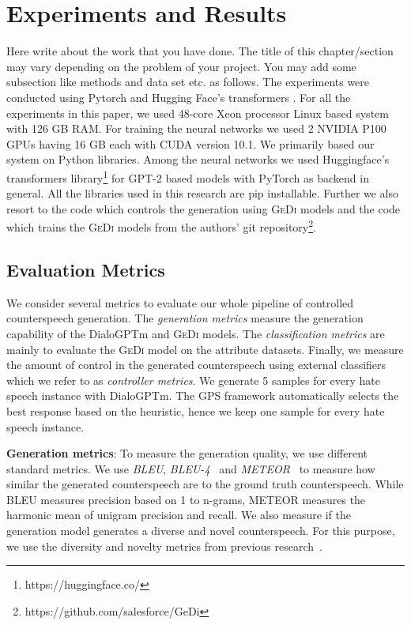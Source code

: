 \chapter{Experiments and Results}
Here write about the work that you have done. The title of this chapter/section may vary depending on the
problem of your project. You may add some subsection like methods and data set etc. as follows.
The experiments were conducted using Pytorch
\textbf{\cite{paszke2019pytorch}} and Hugging Face’s transformers \textbf{\cite{wolf2020huggingfaces}}. For all the experiments in this paper, we used 48-core Xeon processor Linux based system with 126 GB RAM. For training  the  neural networks  we  used 2 NVIDIA P100 GPUs having 16 GB each with CUDA version 10.1. We primarily based our system on Python libraries. Among the neural networks we used Huggingface's transformers library\footnote{https://huggingface.co/} for GPT-2 based models with PyTorch as backend in general. All the libraries used in this research are pip installable. Further we also resort to the code which controls the generation using \textsc{GeDi} models and the code which trains the \textsc{GeDi} models from the authors' git repository\footnote{https://github.com/salesforce/GeDi}.

\section{Evaluation Metrics}

We consider several metrics to evaluate our whole pipeline of controlled counterspeech generation. The \textit{generation metrics} measure the generation capability of the DialoGPTm and \textsc{GeDi} models. The \textit{classification metrics} are mainly to evaluate the \textsc{GeDi} model on the attribute datasets. Finally, we measure the amount of control in the generated counterspeech using external classifiers which we refer to as \textit{controller metrics}. We generate 5 samples for every hate speech instance with DialoGPTm. The GPS framework automatically selects the best response based on the heuristic, hence we keep one sample for every hate speech instance.

\newpage

\noindent\textbf{Generation metrics}: To measure the generation quality, we use different standard metrics. We use \textit{BLEU}, \textit{BLEU-4}~\cite{papineni2002bleu} and \textit{METEOR}~\cite{banerjee2005meteor} to measure how similar the generated counterspeech are to the ground truth counterspeech. While BLEU measures precision based on 1 to n-grams, METEOR measures the harmonic mean of unigram precision and recall. We also measure if the generation model generates a diverse and novel counterspeech. For this purpose, we use the diversity and novelty metrics from previous research~\cite{wang2018sentigan}.\newline


